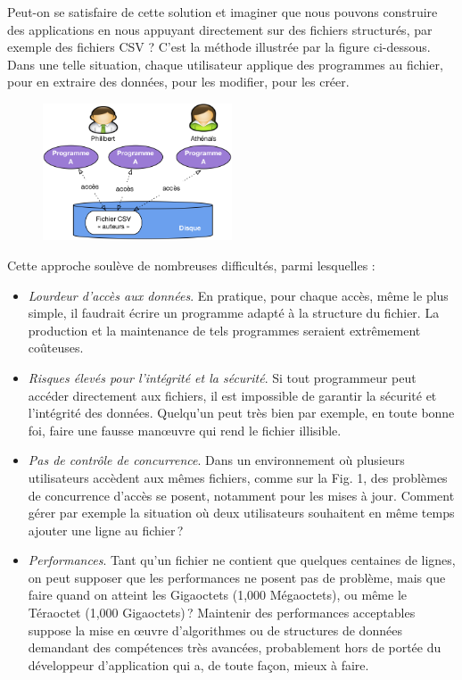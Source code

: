 \documentclass[
  letterpaper,
  DIV=11,
  numbers=noendperiod]{scrartcl}
\providecommand{\tightlist}{%
  \setlength{\itemsep}{0pt}\setlength{\parskip}{0pt}}\usepackage{longtable,booktabs,array}
\begin{document}
Peut-on se satisfaire de cette solution et imaginer que nous pouvons
construire des applications en nous appuyant directement sur des
fichiers structurés, par exemple des fichiers CSV ? C'est la méthode
illustrée par la figure ci-dessous. Dans une telle situation, chaque
utilisateur applique des programmes au fichier, pour en extraire des
données, pour les modifier, pour les créer.

\begin{figure}

{\centering \includegraphics[width=0.5\textwidth,height=\textheight]{BDD1.png}

}

\end{figure}

Cette approche soulève de nombreuses difficultés, parmi lesquelles :

\begin{itemize}
\tightlist
\item
  \emph{Lourdeur d'accès aux données}. En pratique, pour chaque accès,
  même le plus simple, il faudrait écrire un programme adapté à la
  structure du fichier. La production et la maintenance de tels
  programmes seraient extrêmement coûteuses.
\item
  \emph{Risques élevés pour l'intégrité et la sécurité}. Si tout
  programmeur peut accéder directement aux fichiers, il est impossible
  de garantir la sécurité et l'intégrité des données. Quelqu'un peut
  très bien par exemple, en toute bonne foi, faire une fausse manœuvre
  qui rend le fichier illisible.
\item
  \emph{Pas de contrôle de concurrence}. Dans un environnement où
  plusieurs utilisateurs accèdent aux mêmes fichiers, comme sur la Fig.
  1, des problèmes de concurrence d'accès se posent, notamment pour les
  mises à jour. Comment gérer par exemple la situation où deux
  utilisateurs souhaitent en même temps ajouter une ligne au fichier\,?
\item
  \emph{Performances}. Tant qu'un fichier ne contient que quelques
  centaines de lignes, on peut supposer que les performances ne posent
  pas de problème, mais que faire quand on atteint les Gigaoctets (1,000
  Mégaoctets), ou même le Téraoctet (1,000 Gigaoctets)\,? Maintenir des
  performances acceptables suppose la mise en œuvre d'algorithmes ou de
  structures de données demandant des compétences très avancées,
  probablement hors de portée du développeur d'application qui a, de
  toute façon, mieux à faire.
\end{itemize}
\end{document}
